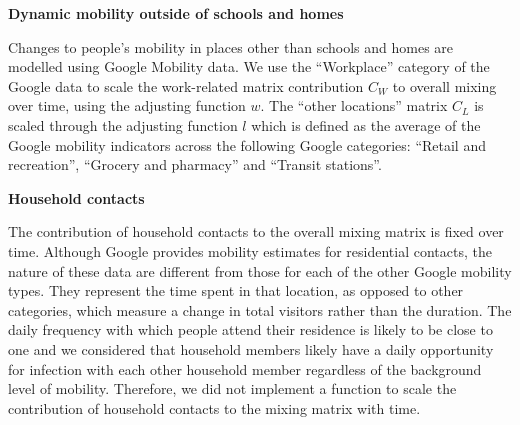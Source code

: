 \vspace{5pt}
\textbf{Dynamic mobility outside of schools and homes}

Changes to people's mobility in places other than schools and homes are modelled using Google Mobility data. We use the ``Workplace''
category of the Google data to scale the work-related matrix contribution $C_W$ to overall mixing over time, using the adjusting function
$w$. The ``other locations'' matrix $C_L$ is scaled through the adjusting function $l$ which is defined as the average of the Google mobility
indicators across the following Google categories: ``Retail and recreation'', ``Grocery and pharmacy'' and ``Transit stations''.

\vspace{5pt}
\textbf{Household contacts}

The contribution of household contacts to the overall mixing matrix is fixed over time. Although Google provides mobility 
estimates for residential contacts, the nature of these data are different from those for each of the other Google mobility 
types. They represent the time spent in that location, as opposed to other categories, which measure a change in total visitors 
rather than the duration. The daily frequency with which people attend their residence is likely to be close to one and we 
considered that household members likely have a daily opportunity for infection with each other household member regardless of
the background level of mobility. Therefore, we did not implement a function to scale the contribution of household contacts 
to the mixing matrix with time.

